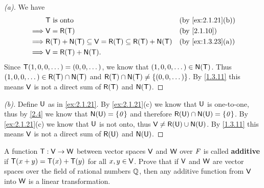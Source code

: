 \begin{proof}[(a)]
  We have
  \begin{align*}
             & \T \text{ is onto}                                                   &  & \by{ex:2.1.21}[b] \\
    \implies & \V = \rg{\T}                                                         &  & \by{2.1.10}       \\
    \implies & \rg{\T} + \ns{\T} \subseteq \V = \rg{\T} \subseteq \rg{\T} + \ns{\T} &  & \by{ex:1.3.23}[a] \\
    \implies & \V = \rg{\T} + \ns{\T}.
  \end{align*}
  Since \(\mathsf{T}(1, 0, 0, \dots) = (0, 0, \dots)\), we know that \((1, 0, 0, \dots) \in \ns{\T}\).
  Thus \((1, 0, 0, \dots) \in \rg{\T} \cap \ns{\T}\) and \(\rg{\T} \cap \ns{\T} \neq \set{(0, 0, \dots)}\).
  By \cref{1.3.11} this means \(\mathsf{V}\) is not a direct sum of \(\rg{\T}\) and \(\ns{\T}\).
\end{proof}

\begin{proof}[(b)]
  Define \(\mathsf{U}\) as in \cref{ex:2.1.21}.
  By \cref{ex:2.1.21}(c) we know that \(\mathsf{U}\) is one-to-one, thus by \cref{2.4} we know that \(\ns{\U} = \set{\zv}\) and therefore \(\rg{\U} \cap \ns{\U} = \set{\zv}\).
  By \cref{ex:2.1.21}(c) we know that \(\mathsf{U}\) is not onto, thus \(\V \neq \rg{\U} \cup \ns{\U}\).
  By \cref{1.3.11} this means \(\mathsf{V}\) is not a direct sum of \(\rg{\U}\) and \(\ns{\U}\).
\end{proof}

\begin{ex}\label{ex:2.1.37}
  A function \(\mathsf{T} : \mathsf{V} \to \mathsf{W}\) between vector spaces \(\mathsf{V}\) and \(\mathsf{W}\) over \(\mathit{F}\) is called \textbf{additive} if \(\mathsf{T}(x + y) = \mathsf{T}(x) + \mathsf{T}(y)\) for all \(x, y \in \mathsf{V}\).
  Prove that if \(\mathsf{V}\) and \(\mathsf{W}\) are vector spaces over the field of rational numbers \(\mathbb{Q}\), then any additive function from \(\mathsf{V}\) into \(\mathsf{W}\) is a linear transformation.
\end{ex}

